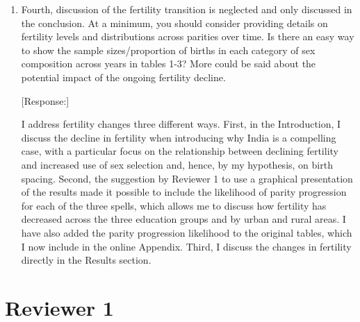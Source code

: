 \documentclass[letterpaper,12pt]{article}
\begin{document}
\begin{enumerate}
\item Fourth, discussion of the fertility transition is neglected and only
discussed in the conclusion. At a minimum, you should consider providing
details on fertility levels and distributions across parities over time.
Is there an easy way to show the sample sizes/proportion of births in
each category of sex composition across years in tables 1-3? More could
be said about the potential impact of the ongoing fertility decline.

[Response:]

I address fertility changes three different ways.
First, in the Introduction, I discuss the decline in fertility when introducing why India 
is a compelling case, with a particular focus on the relationship between declining fertility 
and increased use of sex selection and, hence, by my hypothesis, on birth spacing.
Second, the suggestion by Reviewer 1 to use a graphical presentation of the results made it 
possible to include the likelihood of parity progression for each of the three spells, 
which allows me to discuss how fertility has decreased across the three education groups
and by urban and rural areas.
I have also added the parity progression likelihood to the original tables, which I now
include in the online Appendix.
Third, I discuss the changes in fertility directly in the Results section. 


% 

\end{enumerate}

\newpage

\section*{Reviewer 1}
\end{document}
